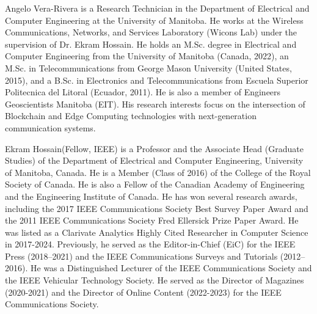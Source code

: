 \documentclass[conference]{IEEEtran}
\begin{document}
%
\begin{IEEEbiography}
{Angelo Vera-Rivera} is a Research Technician in the Department of Electrical and Computer Engineering at the University of Manitoba. He works at the Wireless Communications, Networks, and Services Laboratory (Wicons Lab) under the supervision of Dr. Ekram Hossain. He holds an M.Sc. degree in Electrical and Computer Engineering from the University of Manitoba (Canada, 2022), an M.Sc. in Telecommunications from George Mason University (United States, 2015), and a B.Sc. in Electronics and Telecommunications from Escuela Superior Politecnica del Litoral (Ecuador, 2011). He is also a member of Engineers Geoscientists Manitoba (EIT). His research interests focus on the intersection of Blockchain and Edge Computing technologies with next-generation communication systems. 
\end{IEEEbiography}
%
\begin{IEEEbiography}{Ekram Hossain}(Fellow, IEEE) is a Professor and the Associate Head (Graduate Studies) of the Department of Electrical and Computer Engineering, University of Manitoba, Canada. He is a Member (Class of 2016) of the College of the Royal Society of Canada. He is also a Fellow of the Canadian Academy of Engineering and the Engineering Institute of Canada. He has won several research awards, including the 2017 IEEE Communications Society Best Survey Paper Award and the 2011 IEEE Communications Society Fred Ellersick Prize Paper Award. He was listed as a Clarivate Analytics Highly Cited Researcher in Computer Science in 2017-2024. Previously, he served as the Editor-in-Chief (EiC) for the IEEE Press (2018–2021) and the IEEE Communications Surveys and Tutorials (2012–2016). He was a Distinguished Lecturer of the IEEE Communications Society and the IEEE Vehicular Technology Society. He served as the Director of Magazines (2020-2021) and the Director of Online Content (2022-2023) for the IEEE Communications Society.
\end{IEEEbiography}
\end{document}
